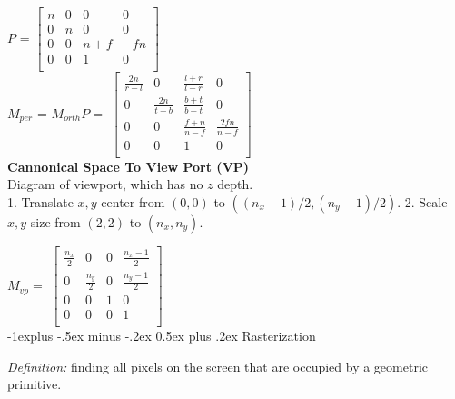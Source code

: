 \documentclass[letterpaper, 8pt]{extarticle}
\makeatletter
\renewcommand{\section}{\@startsection{section}{1}{0mm}%
                                {-1explus -.5ex minus -.2ex}%
                                {0.5ex plus .2ex}%
                                {\normalfont\small\bfseries}}
\makeatother
\begin{document}
\begin{multicols*}{4}
    $P$ =
    \(
    \begin{bmatrix}
        n & 0 & 0   & 0   \\
        0 & n & 0   & 0   \\
        0 & 0 & n+f & -fn \\
        0 & 0 & 1   & 0   \\
    \end{bmatrix}
    \)\\
    $M_{per}$ = $M_{orth}P =$
    \(
    \begin{bmatrix}
        \frac{2n}{r-l} & 0              & \frac{l+r}{l-r} & 0               \\
        0              & \frac{2n}{t-b} & \frac{b+t}{b-t} & 0               \\
        0              & 0              & \frac{f+n}{n-f} & \frac{2fn}{n-f} \\
        0              & 0              & 1               & 0               \\
    \end{bmatrix}
    \)\\

    \textbf{Cannonical Space To View Port (VP)}\\

    Diagram of viewport, which has no $z$ depth.\\
    1. Translate $x,y$ center from $(0,0)$ to $((n_x-1)/2, (n_y-1)/2)$.
    2. Scale $x,y$ size from $(2,2)$ to $(n_x, n_y)$.

    $M_{vp} = $
    \(
    \begin{bmatrix}
        \frac{n_x}{2} & 0             & 0 & \frac{n_x-1}{2} \\
        0             & \frac{n_y}{2} & 0 & \frac{n_y-1}{2} \\
        0             & 0             & 1 & 0               \\
        0             & 0             & 0 & 1               \\
    \end{bmatrix}
    \)\\



    \section{Rasterization}

    \textit{Definition:} finding all pixels on the screen that are occupied by a geometric primitive.


\end{multicols*}
\end{document}

